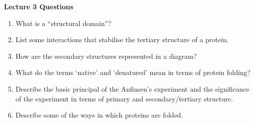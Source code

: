 \newpage
\begin{center}
\textbf{Lecture 3 Questions}
\end{center}

\begin{enumerate}

\item What is a ``structural domain''?


\item List some interactions that stabilise the tertiary structure of a protein.


\item How are the secondary structures represented in a diagram?


\item What do the terms `native' and `denatured' mean in terms of protein folding?


\item Describe the basic principal of the Anfinsen's experiment and the significance of the experiment in terms of primary and secondary/tertiary structure.


\item Describe some of the ways in which proteins are folded.


\end{enumerate}
